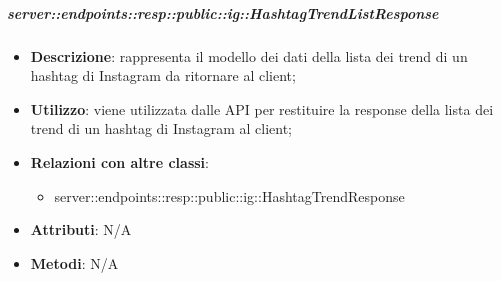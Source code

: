    \subparagraph{server::endpoints::resp::public::ig::HashtagTrendListResponse} %
    \label{subp:bdsm_app_server_endpoints_resp_public_ig_hashtagtrendlistresponse}
    \begin{itemize}
      \item \textbf{Descrizione}: rappresenta il modello dei dati della lista dei trend di un hashtag di Instagram da ritornare al client;
      \item \textbf{Utilizzo}: viene utilizzata dalle API per restituire la response della lista dei trend di un hashtag di Instagram al client;
      \item \textbf{Relazioni con altre classi}:
        \begin{itemize}
          \item server::endpoints::resp::public::ig::HashtagTrendResponse
        \end{itemize}
    \item \textbf{Attributi}: N/A
    \item \textbf{Metodi}: N/A
      \end{itemize}

